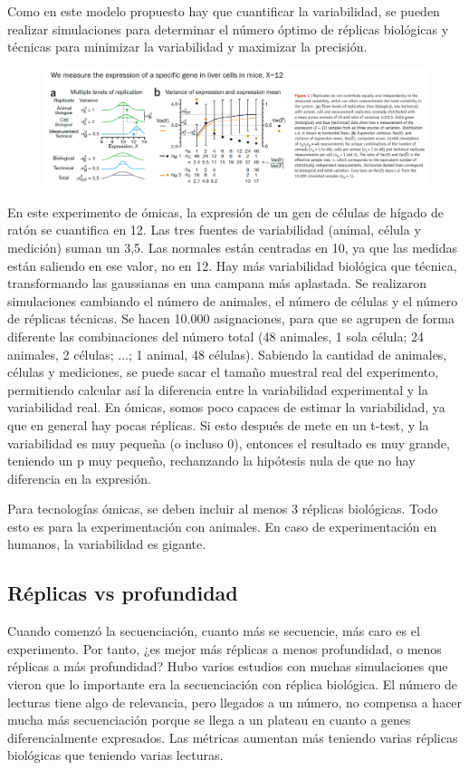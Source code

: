Como en este modelo propuesto hay que cuantificar la variabilidad, se pueden realizar simulaciones para determinar el número óptimo de réplicas biológicas y técnicas para minimizar la variabilidad y maximizar la precisión.

\begin{figure}[h]
\centering
\includegraphics[width = \textwidth]{figs/replicates.png}
\end{figure}

En este experimento de ómicas, la expresión de un gen de células de hígado de ratón se cuantifica en 12. Las tres fuentes de variabilidad (animal, célula y medición) suman un 3,5. Las normales están centradas en 10, ya que las medidas están saliendo en ese valor, no en 12. Hay más variabilidad biológica que técnica, transformando las gaussianas en una campana más aplastada. Se realizaron simulaciones cambiando el número de animales, el número de células y el número de réplicas técnicas. Se hacen 10.000 asignaciones, para que se agrupen de forma diferente las combinaciones del número total (48 animales, 1 sola célula; 24 animales, 2 células; ...; 1 animal, 48 células). Sabiendo la cantidad de animales, células y mediciones, se puede sacar el tamaño muestral real del experimento, permitiendo calcular así la diferencia entre la variabilidad experimental y la variabilidad real. En ómicas, somos poco capaces de estimar la variabilidad, ya que en general hay pocas réplicas. Si esto después de mete en un t-test, y la variabilidad es muy pequeña (o incluso 0), entonces el resultado es muy grande, teniendo un p muy pequeño, rechanzando la hipótesis nula de que no hay diferencia en la expresión.

Para tecnologías ómicas, se deben incluir al menos 3 réplicas biológicas. Todo esto es para la experimentación con animales. En caso de experimentación en humanos, la variabilidad es gigante. 

\subsection{Réplicas vs profundidad}
Cuando comenzó la secuenciación, cuanto más se secuencie, más caro es el experimento. Por tanto, ¿es mejor más réplicas a menos profundidad, o menos réplicas a más profundidad? Hubo varios estudios con muchas simulaciones que vieron que lo importante era la secuenciación con réplica biológica. El número de lecturas tiene algo de relevancia, pero llegados a un número, no compensa a hacer mucha más secuenciación porque se llega a un plateau en cuanto a genes diferencialmente expresados. Las métricas aumentan más teniendo varias réplicas biológicas que teniendo varias lecturas. 

